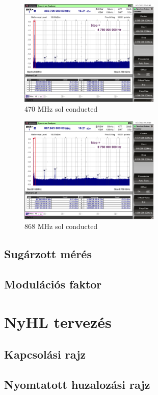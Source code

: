 \documentclass[a4paper,12pt,titlepage]{article}
\begin{document}
            \begin{figure}
                \centering
                \includegraphics[width=0.6\textwidth]{kep/szerkesztett/sol-470-conducted.png}
                \caption{470 MHz sol conducted}
                \label{fig:sol-470-conducted.png}
            \end{figure}

            \begin{figure}
                \centering
                \includegraphics[width=0.6\textwidth]{kep/szerkesztett/sol-868-conducted.png}
                \caption{868 MHz sol conducted}
                \label{fig:sol-868-conducted.png}
            \end{figure}


        \subsection{Sugárzott mérés}
        \subsection{Modulációs faktor}
    \section{NyHL tervezés}
        \subsection{Kapcsolási rajz}
        \subsection{Nyomtatott huzalozási rajz}
\end{document}
